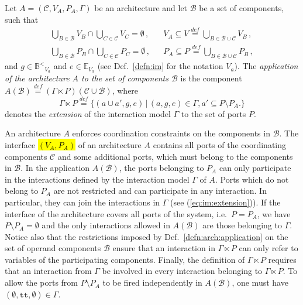 \documentclass{llncs}
\newcommand{\todoSBin}[2][inline,color=green!40]{\todo[#1]{\textbf{To-do Simon: } {#2}}}
\newcommand{\defn}[1]{Def.~\ref{defn:#1}}
\newcommand{\eq}[1]{(\ref{eq:#1})}
\newcommand{\cB}{\ensuremath{\mathcal{B}}}
\newcommand{\sB}{\ensuremath{\mathbb{B}}}
\newcommand{\cC}{\ensuremath{\mathcal{C}}}
\newcommand{\sE}{\ensuremath{\mathbb{E}}}
\newcommand{\ie}[1][\ ]{i.e.#1}
\newcommand{\bydef}[1]{\ensuremath{\stackrel{\mathit{\scriptscriptstyle def}}{#1}}}
\newcommand{\setdefb}[2]{\ensuremath{\bigl\{{#1}\,\bigl|\,{#2}\bigr.\bigr\}}}
\newcommand{\true} {\ensuremath{\mathtt{t\!t}}}
\newcommand{\noop} {\ensuremath{\emptyset}} %
\newcommand{\ordbool}{\ensuremath{\sB^{<}}}
\newcommand{\guards}[1]{\ensuremath{\ordbool_{#1}}}
\newcommand{\exprs}[1]{\ensuremath{\sE_{#1}}}
\newcommand{\export}[1][]{\ensuremath{\varepsilon_{#1}}}
\newcommand{\supp}[1]{\ensuremath{\mathrm{supp}(#1)}}
\newcommand{\IMextend}[2]{\ensuremath{#1 \ltimes #2}}
\newcommand{\arequiv}{\equiv}
\begin{document}
\begin{definition}
  \label{defn:arch:application}
  Let $A = (\cC, V_A, P_A, \Gamma)$ be an architecture and let $\cB$
  be a set of components, such that
%
  \begin{align}
    \bigcup_{B \in \cB} V_B \cap \bigcup_{C \in \cC} V_C = \emptyset\,,
    &&
    V_A \subseteq V \bydef{=} \bigcup_{B \in \cB \cup \cC} V_B\,,
    \\
    \bigcup_{B \in \cB} P_B \cap \bigcup_{C \in \cC} P_C = \emptyset\,,
    &&
    P_A \subseteq P \bydef{=} \bigcup_{B \in \cB \cup \cC} P_B\,,
  \end{align}
%
  and
  $g \in \guards{V_a}$ and
  $e \in \exprs{V_a}$ (see \defn{im} for the notation $V_a$).
%
  The \emph{application of the architecture $A$ to the set of
  components $\cB$} is the component $ A(\cB) \bydef{=}
  (\IMextend{\Gamma}{P})(\cC \cup \cB)$, where
%
  \begin{equation}
    \label{eq:im:extension}
    \IMextend{\Gamma}{P} \bydef{=}
    \setdefb{
      (a \cup a', g, e)
    }{
      (a, g, e) \in \Gamma, a' \subseteq P \setminus P_A
    }
  \end{equation}
%
  denotes the \emph{extension} of the interaction model $\Gamma$
  to the set of ports $P$.
\end{definition}

\todoSBin{Define equivalence $\arequiv$?}

An architecture $A$ enforces coordination constraints on the
components in $\cB$.  The interface \hl{$(V_A, P_A)$} of an
architecture $A$ contains all ports of the coordinating
components $\cC$ and some additional ports, which must belong to
the components in $\cB$.  In the application $A(\cB)$, the ports
belonging to $P_A$ can only participate in the interactions
defined by the interaction model $\Gamma$ of $A$.  Ports which do
not belong to $P_A$ are not restricted and can participate in any
interaction.  In particular, they can join the interactions in
$\Gamma$ (see \eq{im:extension}).  If the interface of the
architecture covers all ports of the system, \ie $P = P_A$, we
have $P\setminus P_A = \emptyset$ and the only interactions
allowed in $A(\cB)$ are those belonging to $\Gamma$.  Notice also
that the restrictions imposed by \defn{arch:application} on the
set of operand components $\cB$ ensure that an interaction in
$\IMextend{\Gamma}{P}$ can only refer to variables of the
participating components.
%
Finally, the definition of $\IMextend{\Gamma}{P}$ requires that
an interaction from $\Gamma$ be involved in every interaction
belonging to $\IMextend{\Gamma}{P}$.  To allow the ports from $P
\setminus P_A$ to be fired independently in $A(\cB)$, one must
have $(\emptyset, \true, \noop) \in \Gamma$.  
\end{document}
